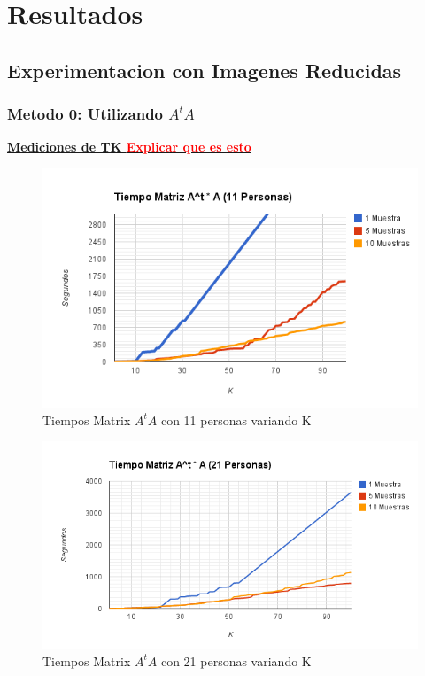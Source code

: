 \section{Resultados}
\subsection{Experimentacion con Imagenes Reducidas}
\subsubsection{Metodo 0: Utilizando $A^tA$}

\underline{\textbf{Mediciones de TK \textcolor{red}{Explicar que es esto}}}

\begin{figure}[H]
\includegraphics[width=1\textwidth]{img/image1.png}
     \caption{Tiempos Matrix $A^tA$ con 11 personas variando K}
     \label{fig:figura1}
\end{figure}

\begin{figure}[H]
\includegraphics[width=1\textwidth]{img/image2.png}
     \caption{Tiempos Matrix $A^tA$ con 21 personas variando K}
     \label{fig:figura1}
\end{figure}

